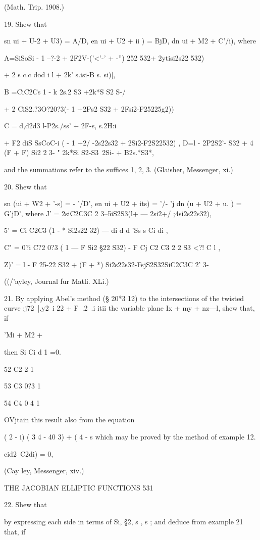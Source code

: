 (Math. Trip. 1908.)

19. Shew that

sn ui + U-2 + U3) = A/D, en ui + U2 + ii ) = BjD, dn ui + M2 + %
C'/i), where

A=SiSoSi - 1 --?-2 + 2F2V-('<'-' + -'') 252 532+ 2ytisi2s22 532)

+ 2 s c.c dod i l + 2k' s.isi-B s. si)],

B =CiC2Cs 1 - k 2s.2 S3 +2k*S S2 S-/

+ 2 CiS2.?3O?20?3(- 1 +2Ps2 S32 + 2Fsi2-F25225g2))

C = d,d2d3 l-P2s./ss' + 2F-s, s.2H:i

+ F2 diS SsCoC-i ( - 1 +2/ -2s22s32 + 2Si2-F2S22532) , D=l - 2P2S2'-
S32 + 4 (F + F) Si2 2 3- " 2k*Si S2-S3~2Si- + B2s.*S3*,

and the summations refer to the suffices 1, 2, 3. (Glaisher,
Messenger, xi.)

20. Shew that

sn (ui + W2 + '-s) = - '/D', en ui + U2 + its) = '/- 'j dn (u + U2 +
u. ) = G'jD', where J' = 2siC2C3C 2 3--5iS2S3(l+ — 2si2+/
;4si2s22s32),

5' = Ci C2C3 (1 - * Si2s22 32) — di d d 'Ss s Ci di ,

C" = 0?i C?2 0?3 ( 1 — F Si2 §22 S32) - F Cj C2 C3 2 2 S3 <?! C l ,

Z)' = l - F 25-22 S32 + (F + *) Si2s22s32-FsjS2S32SiC2C3C 2' 3-

((/'ayley, Journal fur Matli. XLi.)

21. By applying Abel's method (§ 20*3 12) to the intersections of the
twisted curve ;j72\ |.y2\ i 22 + F\ .2\ .i itii the variable plane Ix
+ my + nz—l, shew that, if

'Mi + M2 + %

then Si Ci d 1 =0.

52 C2 2 1

53 C3 0?3 1

54 C4 0 4 1

OVjtain this result also from the equation

( 2 - i) ( 3 4 - 40 3) + ( 4 - s which may be proved by the method of
example 12.

 cid2~C2di) = 0,

(Cay ley, Messenger, xiv.)

THE JACOBIAN ELLIPTIC FUNCTIONS 531

22. Shew that

by expressing each side in terms of Si, §2, s , s ; and deduce from
example 21 that, if

